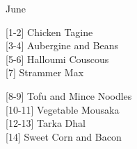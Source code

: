 		\begin{menu}{June}
    
    \begin{recipelist}
    
        {\scriptsize[1-2]} Chicken Tagine\\
        {\scriptsize[3-4]} Aubergine and Beans\\
        {\scriptsize[5-6]} Halloumi Couscous\\
        {\scriptsize[7]} Strammer Max\\%
    \end{recipelist}%
    \begin{recipelist}
    
        {\scriptsize[8-9]} Tofu and Mince Noodles\\
        {\scriptsize[10-11]} Vegetable Mousaka\\
        {\scriptsize[12-13]} Tarka Dhal\\
        {\scriptsize[14]} Sweet Corn and Bacon\\%
    \end{recipelist}\par%
  

\end{menu}
